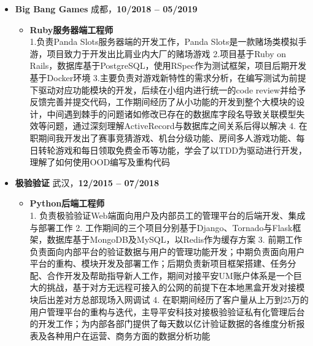 \documentclass[11pt, a4paper,sans]{moderncv}     %
\begin{document}
    \begin{itemize}

        \item{\yahei \textbf{Big Bang Games} \hfill 成都，\textbf{10/2018 -- 05/2019}}

        \begin{itemize}
            \item{\yahei \textbf{Ruby服务器端工程师}\\
            1.负责Panda Slots服务器端的开发工作，Panda Slots是一款赌场类模拟手游，项目致力于开发出比肩业内大厂的赌场游戏 2.项目基于Ruby on Rails，数据库基于PostgreSQL，使用RSpec作为测试框架，项目后期开发基于Docker环境 3.主要负责对游戏新特性的需求分析，在编写测试为前提下驱动对应功能模块的开发，后续在小组内进行统一的code review并给予反馈完善并提交代码，工作期间经历了从小功能的开发到整个大模块的设计，中间遇到棘手的问题诸如修改已存在的数据库字段名导致关联模型失效等问题，通过深刻理解ActiveRecord与数据库之间关系后得以解决 4. 在职期间我开发出了赛事竞猜游戏、机台分级功能、房间多人游戏功能、每日转轮游戏和每日领取免费金币等功能，学会了以TDD为驱动进行开发，理解了如何使用OOD编写及重构代码}
        \end{itemize}
        \vspace{6pt}

        \item{\yahei \textbf{极验验证} \hfill 武汉，\textbf{12/2015 -- 07/2018}}

        \begin{itemize}
            \item{\yahei \textbf{Python后端工程师}\\
            1. 负责极验验证Web端面向用户及内部员工的管理平台的后端开发、集成与部署工作 2. 工作期间的三个项目分别基于Django、Tornado与Flask框架，数据库基于MongoDB及MySQL，以Redis作为缓存方案 3. 前期工作负责面向内部平台的验证数据与用户的管理功能开发；中期负责面向用户平台的重构、模块开发及部署工作；后期负责新项目框架搭建、任务分配、合作开发及帮助指导新人工作，期间对接平安UM账户体系是一个巨大的挑战，基于对方无远程可接入的公网的前提下在本地黑盒开发对接模块后出差对方总部现场入网调试 4. 在职期间经历了客户量从上万到25万的用户管理平台的重构与迭代，主导平安科技对接极验验证私有化管理后台的开发工作；为内部各部门提供了每天数以亿计验证数据的各维度分析报表及各种用户在运营、商务方面的数据分析功能}
        \end{itemize}

    \end{itemize}
    \vspace{-8pt}
\end{document}
